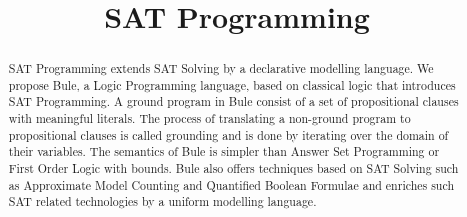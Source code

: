 \documentclass[conference]{IEEEtran}
\title{ SAT Programming}
\author{\IEEEauthorblockN{Jean Christoph Jung}
\IEEEauthorblockA{\textit{Universit\"at Bremen} \\
Bremen, Germany}
}
\author{\IEEEauthorblockN{ Valentin Mayer-Eichberger}
\IEEEauthorblockA{\textit{Technische Universit\"at} \\
Berlin, Germany}
}
\begin{document}
\maketitle

\newcommand{\bcore}{\ensuremath{\text{Bule}_\text{core}}\xspace}
\newcommand{\bule}{\ensuremath{\text{Bule}}\xspace}


\begin{abstract}
    SAT Programming extends SAT Solving by a declarative modelling language. 
    We propose Bule, a Logic Programming language, based on classical logic that introduces SAT Programming. 
    A ground program in Bule consist of a set of propositional clauses with meaningful literals. 
    The process of translating a non-ground program to propositional clauses is called grounding and is done by iterating over the domain of their variables. 
    The semantics of Bule is simpler than Answer Set Programming or First Order Logic with bounds.  
    Bule also offers techniques based on SAT Solving such as Approximate Model Counting and Quantified Boolean Formulae 
    and enriches such SAT related technologies by a uniform modelling language. 





\end{abstract}
\end{document}
